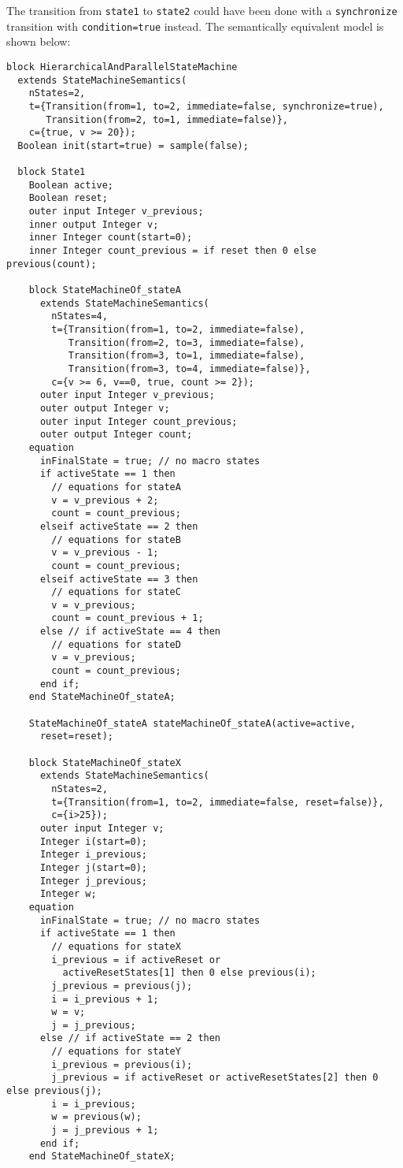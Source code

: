 \begin{example}
The transition from \lstinline!state1! to \lstinline!state2! could have been done with a
\lstinline!synchronize! transition with \lstinline!condition=true! instead. The semantically
equivalent model is shown below:
\begin{lstlisting}[language=modelica]
block HierarchicalAndParallelStateMachine
  extends StateMachineSemantics(
    nStates=2,
    t={Transition(from=1, to=2, immediate=false, synchronize=true),
       Transition(from=2, to=1, immediate=false)},
    c={true, v >= 20});
  Boolean init(start=true) = sample(false);

  block State1
    Boolean active;
    Boolean reset;
    outer input Integer v_previous;
    inner output Integer v;
    inner Integer count(start=0);
    inner Integer count_previous = if reset then 0 else previous(count);

    block StateMachineOf_stateA
      extends StateMachineSemantics(
        nStates=4,
        t={Transition(from=1, to=2, immediate=false),
           Transition(from=2, to=3, immediate=false),
           Transition(from=3, to=1, immediate=false),
           Transition(from=3, to=4, immediate=false)},
        c={v >= 6, v==0, true, count >= 2});
      outer input Integer v_previous;
      outer output Integer v;
      outer input Integer count_previous;
      outer output Integer count;
    equation
      inFinalState = true; // no macro states
      if activeState == 1 then
        // equations for stateA
        v = v_previous + 2;
        count = count_previous;
      elseif activeState == 2 then
        // equations for stateB
        v = v_previous - 1;
        count = count_previous;
      elseif activeState == 3 then
        // equations for stateC
        v = v_previous;
        count = count_previous + 1;
      else // if activeState == 4 then
        // equations for stateD
        v = v_previous;
        count = count_previous;
      end if;
    end StateMachineOf_stateA;

    StateMachineOf_stateA stateMachineOf_stateA(active=active,
      reset=reset);

    block StateMachineOf_stateX
      extends StateMachineSemantics(
        nStates=2,
        t={Transition(from=1, to=2, immediate=false, reset=false)},
        c={i>25});
      outer input Integer v;
      Integer i(start=0);
      Integer i_previous;
      Integer j(start=0);
      Integer j_previous;
      Integer w;
    equation
      inFinalState = true; // no macro states
      if activeState == 1 then
        // equations for stateX
        i_previous = if activeReset or
          activeResetStates[1] then 0 else previous(i);
        j_previous = previous(j);
        i = i_previous + 1;
        w = v;
        j = j_previous;
      else // if activeState == 2 then
        // equations for stateY
        i_previous = previous(i);
        j_previous = if activeReset or activeResetStates[2] then 0 else previous(j);
        i = i_previous;
        w = previous(w);
        j = j_previous + 1;
      end if;
    end StateMachineOf_stateX;


\end{lstlisting}
\end{example}
